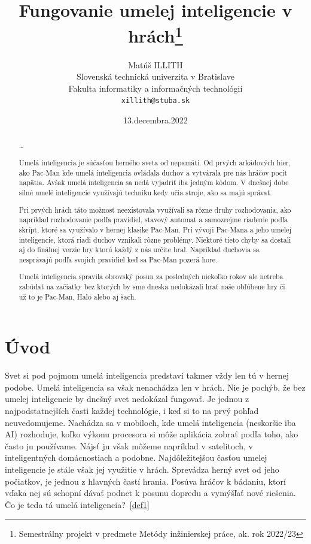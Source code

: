\documentclass[10pt,oneside,slovak,a4paper]{article}
\title{Fungovanie umelej inteligencie v hrách\thanks{Semestrálny projekt v predmete Metódy inžinierskej práce, ak. rok 2022/23}} %
\author{Matúš ILLITH\\[2pt]
	{\small Slovenská technická univerzita v Bratislave}\\
	{\small Fakulta informatiky a informačných technológií}\\
	{\small \texttt{xillith@stuba.sk}}
	}
\date{\small 13.decembra.2022}
\begin{document}
\maketitle

\begin{abstract}
\ldots



Umelá inteligencia je súčasťou herného sveta od nepamäti. Od prvých arkádových hier, ako Pac-Man kde umelá inteligencia ovládala duchov a vytvárala pre nás hráčov pocit napätia. Avšak umelá inteligencia sa nedá vyjadriť iba jedným kódom. V dnešnej dobe silné umelé inteligencie využívajú techniku kedy učia stroje, ako sa majú správať.

Pri prvých hrách táto možnosť neexistovala využívali sa rôzne druhy rozhodovania, ako napríklad rozhodovanie podľa pravidiel, stavový automat a samozrejme riadenie podľa skrípt, ktoré sa využívalo v hernej klasike Pac-Man. Pri vývoji Pac-Mana a jeho umelej inteligencie, ktorá riadi duchov vznikali rôzne problémy. Niektoré tieto chyby sa dostali aj do finálnej verzie hry ktorú každý z nás určite hral. Napríklad duchovia sa nesprávajú podľa svojich pravidiel keď sa Pac-Man pozerá hore.

Umelá inteligencia spravila obrovský posun za posledných niekoľko rokov ale netreba zabúdať na začiatky bez ktorých by sme dneska nedokázali hrať naše obľúbene hry či už to je Pac-Man, Halo alebo aj šach.
\end{abstract}
\newpage
\tableofcontents
\newpage

\section{Úvod}




Svet si pod pojmom umelá inteligencia predstaví takmer vždy len tú v hernej podobe. Umelá inteligencia sa však nenachádza len v hrách. Nie je pochýb, že bez umelej inteligencie by dnešný svet nedokázal fungovať. Je jednou z najpodstatnejších časti každej technológie, i keď si to na prvý pohľad neuvedomujeme. Nachádza sa v mobiloch, kde umelá inteligencia (neskoršie iba AI) rozhoduje, koľko výkonu procesora si môže aplikácia zobrať podľa toho, ako často ju používame. Nájsť ju však môžeme napríklad v satelitoch, v inteligentných domácnostiach a podobne. Najdôležitejšou časťou umelej inteligencie je stále však jej využitie v hrách. Sprevádza herný svet od jeho počiatkov, je jednou z hlavných častí hrania. Posúva hráčov k bádaniu, ktorí vďaka nej sú schopní dávať podnet k posunu dopredu a vymýšľať nové riešenia.
Čo je teda tá umelá inteligencia?~\ref{def1}
\end{document}
